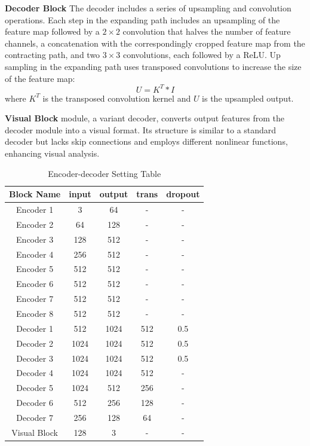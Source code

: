 \documentclass[twocolumn]{article}
\begin{document}
\textbf{Decoder Block} The decoder includes a series of upsampling and convolution operations. Each step in the expanding path includes an upsampling of the feature map followed by a $2\times2$ convolution that halves the number of feature channels, a concatenation with the correspondingly cropped feature map from the contracting path, and two $3\times3$ convolutions, each followed by a ReLU. Up sampling in the expanding path uses transposed convolutions to increase the size of the feature map:
\[
	U = K^T * I
\]
where \(K^T\) is the transposed convolution kernel and \(U\) is the upsampled output.

\textbf{Visual Block} module, a variant decoder, converts output features from the decoder module into a visual format. Its structure is similar to a standard decoder but lacks skip connections and employs different nonlinear functions, enhancing visual analysis.

\begin{table}[h]
	\caption{Encoder-decoder Setting Table}
	\label{tab:encoder_setting}
	\begin{tabular}{ccccc}
		\hline
		Block Name   & input & output & trans & dropout \\
		\hline
		Encoder 1    & 3     & 64     & -     & -       \\
		Encoder 2    & 64    & 128    & -     & -       \\
		Encoder 3    & 128   & 512    & -     & -       \\
		Encoder 4    & 256   & 512    & -     & -       \\
		Encoder 5    & 512   & 512    & -     & -       \\
		Encoder 6    & 512   & 512    & -     & -       \\
		Encoder 7    & 512   & 512    & -     & -       \\
		Encoder 8    & 512   & 512    & -     & -       \\
		Decoder 1    & 512   & 1024   & 512   & 0.5     \\
		Decoder 2    & 1024  & 1024   & 512   & 0.5     \\
		Decoder 3    & 1024  & 1024   & 512   & 0.5     \\
		Decoder 4    & 1024  & 1024   & 512   & -       \\
		Decoder 5    & 1024  & 512    & 256   & -       \\
		Decoder 6    & 512   & 256    & 128   & -       \\
		Decoder 7    & 256   & 128    & 64    & -       \\
		Visual Block & 128   & 3      & -     & -       \\
		\hline
	\end{tabular}
\end{table}
\end{document}
